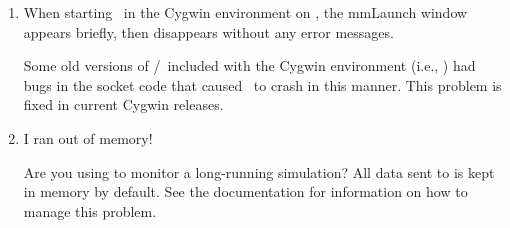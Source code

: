 \begin{enumerate}

\item When starting \OOMMF\ in the Cygwin environment on \Windows, the
mmLaunch window appears briefly, then disappears without any error
messages.

Some old versions of \Tcl/\Tk\ included with the Cygwin environment
(i.e., ) had bugs in the socket code
that caused \OOMMF\ to crash in this manner.  This problem is fixed in
current Cygwin releases.

\item I ran out of memory!

Are you using  to monitor a
long-running simulation?  All data sent to  is kept in
memory by default.  See the  documentation for information
on how to manage this problem.

\end{enumerate}



